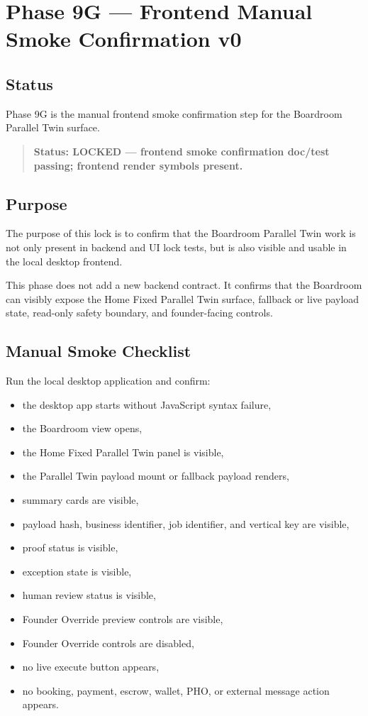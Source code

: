 \section{Phase 9G --- Frontend Manual Smoke Confirmation v0}
\label{sec:aion-boardroom-frontend-manual-smoke-confirmation-v0}

\subsection{Status}

Phase 9G is the manual frontend smoke confirmation step for the Boardroom Parallel Twin surface.

\begin{quote}
\textbf{Status: LOCKED --- frontend smoke confirmation doc/test passing; frontend render symbols present.}
\end{quote}

\subsection{Purpose}

The purpose of this lock is to confirm that the Boardroom Parallel Twin work is not only present in backend and UI lock tests, but is also visible and usable in the local desktop frontend.

This phase does not add a new backend contract. It confirms that the Boardroom can visibly expose the Home Fixed Parallel Twin surface, fallback or live payload state, read-only safety boundary, and founder-facing controls.

\subsection{Manual Smoke Checklist}

Run the local desktop application and confirm:

\begin{itemize}
  \item the desktop app starts without JavaScript syntax failure,
  \item the Boardroom view opens,
  \item the Home Fixed Parallel Twin panel is visible,
  \item the Parallel Twin payload mount or fallback payload renders,
  \item summary cards are visible,
  \item payload hash, business identifier, job identifier, and vertical key are visible,
  \item proof status is visible,
  \item exception state is visible,
  \item human review status is visible,
  \item Founder Override preview controls are visible,
  \item Founder Override controls are disabled,
  \item no live execute button appears,
  \item no booking, payment, escrow, wallet, PHO, or external message action appears.
\end{itemize}

